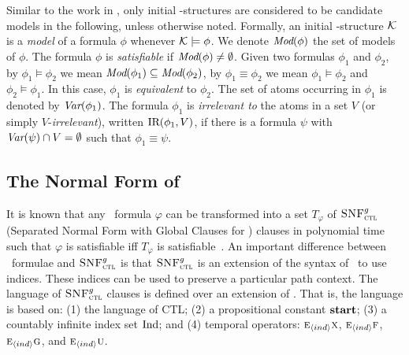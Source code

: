 \documentclass[letterpaper]{article}
\begin{document}
Similar to the work in \cite{browne1988characterizing,Bolotov:1999:JETAI},
only initial \MPK-structures are considered to be candidate models
in the following, unless otherwise noted. Formally,
an initial \MPK-structure $\cal K$ is a {\em model} of a formula $\phi$
whenever ${\cal K}\models\phi$.
We denote $\textit{Mod}(\phi)$ the set of models of $\phi$.
The formula
$\phi$  is {\em satisfiable}
if $\textit{Mod}(\phi)\neq\emptyset$.
Given two formulas $\phi_1$ and $\phi_2$,  by $\phi_1\models\phi_2$ we mean $\textit{Mod}(\phi_1)\subseteq\textit{Mod}(\phi_2)$, by $\phi_1\equiv\phi_2$ we mean $\phi_1\models\phi_2$ and $\phi_2\models\phi_1$.
In this case, $\phi_1$ is {\em equivalent} to $\phi_2$.
The set of atoms occurring in $\phi_1$ is denoted by $\textit{Var}(\phi_1)$.
The formula $\phi_1$ is {\em irrelevant to} the atoms in a set $V$ (or simply $V$-{\em irrelevant}), written $\textrm{IR}(\phi_1,V)$,
if there is a formula $\psi$ with
$\textit{Var}(\psi)\cap V=\emptyset$ such that $\phi_1\equiv\psi$.


\subsection{The Normal Form of \CTL}
It is  known that any \CTL\ formula $\varphi$ can be transformed into a set $T_\varphi$ of ${\textsc{SNF}_{\textsc{ctl}}^g}$ (Separated Normal Form with Global Clauses for \CTL) clauses in polynomial time such that $\varphi$ is satisfiable iff $T_\varphi$ is satisfiable~\cite{zhang2008first}.
An important difference between \CTL\ formulae and ${\textsc{SNF}_{\textsc{ctl}}^g}$ is that ${\textsc{SNF}_{\textsc{ctl}}^g}$ is an extension of the syntax of \CTL\ to use indices. These indices can be used to preserve a particular path context. The language of ${\textsc{SNF}_{\textsc{ctl}}^g}$ clauses is defined over an extension of \CTL. That is, the language is based on: (1) the language of CTL; (2) a propositional constant $\textbf{start}$; (3) a countably infinite index set $\textrm{Ind}$; and (4) temporal operators: $\textsc{e}_{{\langle{ind}\rangle}} \textsc{x}$, $\textsc{e}_{{\langle{ind}\rangle}} \textsc{f}$, $\textsc{e}_{{\langle{ind}\rangle}} \textsc{g}$, and $\textsc{e}_{{\langle{ind}\rangle}} \textsc{u}$. %
\end{document}
